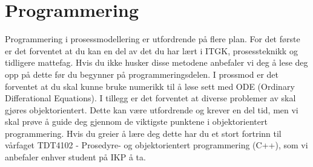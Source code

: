 \clearpage
\section{Programmering}\label{sec:prog}
Programmering i prosessmodellering er utfordrende på flere plan. For det første er det forventet at du kan en del av det du har lært i ITGK, prosessteknikk og tidligere mattefag. Hvis du ikke husker disse metodene anbefaler vi deg å lese deg opp på dette før du begynner på programmeringsdelen. I prossmod er det forventet at du skal kunne bruke numerikk til å løse sett med ODE (Ordinary Differational Equations). I tillegg er det forventet at diverse problemer av skal gjøres objektorientert. Dette kan være utfordrende og krever en del tid, men vi skal prøve å guide deg gjennom de viktigste punktene i objektorientert programmering. Hvis du greier å lære deg dette har du et stort fortrinn til vårfaget TDT4102 - Prosedyre- og objektorientert programmering (C++), som vi anbefaler enhver student på IKP å ta.

 



